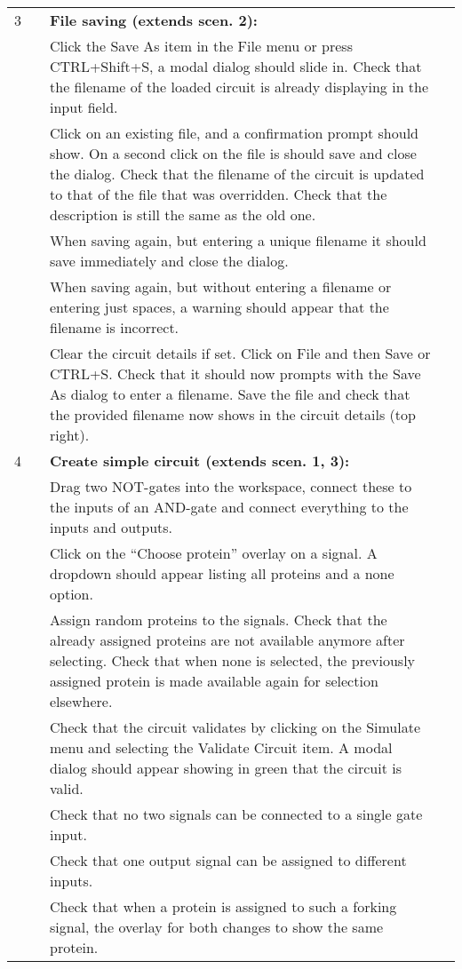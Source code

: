 \documentclass{article}
\newcounter{step}
\newcommand{\step}{\arabic{step}\stepcounter{step}}
\begin{document}
\begin{center}
\begin{longtable}{r r  p{} l }
3 & & \textbf{File saving (extends scen. 2):}\\
&\step& Click the Save As item in the File menu or press CTRL+Shift+S, a modal dialog should slide in. Check that the filename of the loaded circuit is already displaying in the input field.\\
&\step& Click on an existing file, and a confirmation prompt should show.
On a second click on the file is should save and close the dialog. Check that the filename of the circuit is updated to that of the file that was overridden. Check that the description is still the same as the old one.\\
&\step& When saving again, but entering a unique filename it should save immediately and close the dialog.\\
&\step& When saving again, but without entering a filename or entering just spaces, a warning should appear that the filename is incorrect.\\
&\step& Clear the circuit details if set. Click on File and then Save or CTRL+S. Check that it should now prompts with the Save As dialog to enter a filename. Save the file and check that the provided filename now shows in the circuit details (top right).\\ \midrule

4 &\setcounter{step}{1}& \textbf{Create simple circuit (extends scen. 1, 3):}\\
&\step& Drag two NOT-gates into the workspace, connect these to the inputs of an AND-gate and connect everything to the inputs and outputs.\\
&\step& Click on the ``Choose protein'' overlay on a signal. A dropdown should appear listing all proteins and a none option.\\
&\step& Assign random proteins to the signals. Check that the already assigned proteins are not available anymore after selecting. Check that when none is selected, the previously assigned protein is made available again for selection elsewhere.\\
&\step& Check that the circuit validates by clicking on the Simulate menu and selecting the Validate Circuit item. A modal dialog should appear showing in green that the circuit is valid.\\
&\step& Check that no two signals can be connected to a single gate input.\\
&\step& Check that one output signal can be assigned to different inputs.\\
&\step& Check that when a protein is assigned to such a forking signal, the overlay for both changes to show the same protein.\\ \midrule


\end{longtable}
\end{center}
\end{document}
